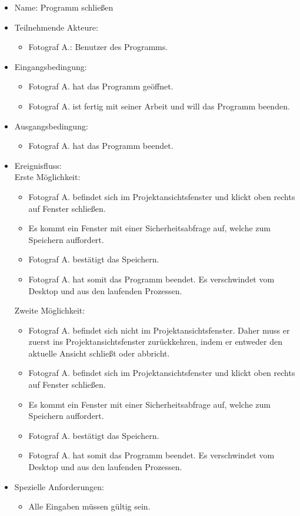 \begin{itemize}
	\begin{itemize}
		\item Name: Programm schließen
		\item Teilnehmende Akteure:
		\begin{itemize}
			\item	Fotograf A.: Benutzer des Programms.
		\end{itemize}
		\item Eingangsbedingung:
		\begin{itemize}
			\item Fotograf A. hat das Programm geöffnet.
			\item Fotograf A. ist fertig mit seiner Arbeit und will das Programm beenden.						
		\end{itemize}
		\item Ausgangsbedingung:
		\begin{itemize}
			\item	Fotograf A. hat das Programm beendet.		
		\end{itemize}
		\item Ereignisfluss:\\Erste Möglichkeit:	
		\begin{itemize}
			\item Fotograf A. befindet sich im Projektansichtsfenster und klickt oben rechts auf Fenster schließen.
			\item Es kommt ein Fenster mit einer Sicherheitsabfrage auf, welche zum Speichern auffordert.
			\item Fotograf A. bestätigt das Speichern.
			\item Fotograf A. hat somit das Programm beendet. Es verschwindet vom Desktop und aus den laufenden Prozessen.
		\end{itemize}
		Zweite Möglichkeit:
		\begin{itemize}
			\item Fotograf A. befindet sich nicht im Projektansichtsfenster. Daher muss er zuerst ins Projektansichtsfenster zurückkehren, indem er entweder den aktuelle Ansicht schließt oder abbricht.
			\item Fotograf A. befindet sich im Projektansichtsfenster und klickt oben rechts auf Fenster schließen.
			\item Es kommt ein Fenster mit einer Sicherheitsabfrage auf, welche zum Speichern auffordert.
			\item Fotograf A. bestätigt das Speichern.
			\item Fotograf A. hat somit das Programm beendet. Es verschwindet vom Desktop und aus den laufenden Prozessen.
		\end{itemize}	
		\item Spezielle Anforderungen:
		\begin{itemize}
			\item	Alle Eingaben müssen gültig sein.		
		\end{itemize}
	\end{itemize}
	

\end{itemize}

